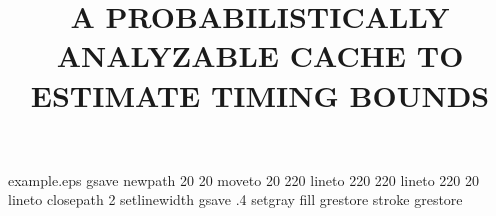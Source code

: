 
\begin{filecontents*}{example.eps}
gsave
newpath
  20 20 moveto
  20 220 lineto
  220 220 lineto
  220 20 lineto
closepath
2 setlinewidth
gsave
  .4 setgray fill
grestore
stroke
grestore
\end{filecontents*}
%
\RequirePackage{fix-cm}
%
\documentclass[smallextended]{svjour3}       %
%
\smartqed  %
%
\usepackage{graphicx}
\usepackage{bbding}
\usepackage{graphicx}
\usepackage[cmex10]{amsmath}
\usepackage{array}
\usepackage[hyphens]{url}
\usepackage{hyperref}
\usepackage{fixltx2e}



\usepackage{booktabs}
\usepackage{mdwlist}
\usepackage[comma,numbers,compress,square]{natbib}
\usepackage{pgfplots}
\usepackage{placeins}
\usepackage{xspace}
\usepackage{algpseudocode}
\usepackage{algorithm}
\usepackage{paralist}
\usepackage{wasysym}
\usepackage{comment}
\usepackage{color}
\usepackage{leading}
\usepackage{filecontents}
\usepackage{verbatim}
\usepackage{balance}
\usepackage{tikz}
\usepackage{pgf}
\usepackage{xxcolor}
\usepackage[colorinlistoftodos]{todonotes}
\usepackage{amssymb,amsmath}
\usepackage{pgfgantt}
%
%
%
%


\title{A PROBABILISTICALLY ANALYZABLE CACHE TO ESTIMATE TIMING BOUNDS%
}

